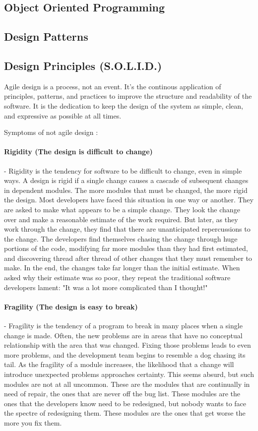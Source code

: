 \documentclass{llncs}
\begin{document}
\subsection{Object Oriented Programming}
\subsection{Design Patterns}
\subsection{Design Principles (S.O.L.I.D.)}
Agile design is a process, not an event.
It's the continous application of principles, patterns, and practices to improve the structure and readability of the software. 
It is the dedication to keep the design of the system as simple, clean, and expressive as possible at all times.

Symptoms of not agile design \cite{MartinASD}:
\paragraph{Rigidity (The design is difficult to change)} - Rigidity is the tendency for software to be difficult to change, even in simple ways. A design is rigid if a single change causes a cascade of subsequent changes in dependent modules.
The more modules that must be changed, the more rigid the design.
Most developers have faced this situation in one way or another. 
They are asked to make what appears to be a simple change.
They look the change over and make a reasonable estimate of the work required.
But later, as they work through the change, they find that there are unanticipated repercussions to the change.
The developers find themselves chasing the change through huge portions of the code, modifying far more modules than they had first estimated, and discovering thread after thread of other changes that they must remember to make.
In the end, the changes take far longer than the initial estimate.
When asked why their estimate was so poor, they repeat the traditional software developers lament: "It was a lot more complicated than I thought!"

\paragraph{Fragility (The design is easy to break)} - Fragility is the tendency of a program to break in many places when a single change is made.
Often, the new problems are in areas that have no conceptual relationship with the area that was changed.
Fixing those problems leads to even more problems, and the development team begins to resemble a dog chasing its tail.
As the fragility of a module increases, the likelihood that a change will introduce unexpected problems approaches certainty.
This seems absurd, but such modules are not at all uncommon.
These are the modules that are continually in need of repair, the ones that are never off the bug list.
These modules are the ones that the developers know need to be redesigned, but nobody wants to face the spectre of redesigning them.
These modules are the ones that get worse the more you fix them.
\end{document}
